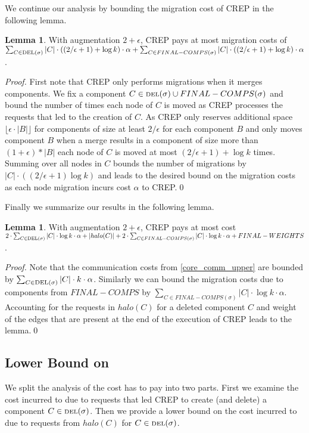 \documentclass[xcolor=dvipsnames, tikz, 12pt]{article}
\newcommand{\nl}{\newline}
\newcommand{\crep}{C{\scriptsize REP}}
\newcommand{\del}{\text{\scriptsize DEL}}
\newcommand{\opt}{\text{O{\scriptsize PT}}}
\theoremstyle{definition}
\newtheorem{lemma}[defi]{Lemma}
\begin{document}
We continue our analysis by bounding the migration cost of \crep{} in the following lemma.
\begin{lemma}
	With augmentation $2+\epsilon$, \crep{} pays at most migration costs of $\sum_{C\in\del{}(\sigma)}|C|\cdot((2/\epsilon+1)+\log k)\cdot\alpha+\sum_{C\in FINAL-COMPS(\sigma)}|C|\cdot((2/\epsilon+1)+\log k)\cdot\alpha$.
\end{lemma}

\textit{Proof.} First note that \crep{} only performs migrations when it merges components.
We fix a component $C\in\del{}(\sigma)\cup FINAL-COMPS(\sigma)$ and bound the number of times each node of $C$ is moved as \crep{} processes the requests that led to the creation of $C$. As \crep{} only reserves additional space $\lfloor\epsilon\cdot|B|\rfloor$ for components of size at least $2/\epsilon$ for each component $B$ and only moves component $B$ when a merge results in a component of size more than $(1+\epsilon)*|B|$ each node of $C$ is moved at most
$(2/\epsilon+1)+\log k$ times. Summing over all nodes in $C$ bounds the number of migrations by $|C|\cdot((2/\epsilon+1) \log k)$ and leads to the desired bound on the migration costs as each node migration incurs cost $\alpha$ to \crep{}.\qed\nl

Finally we summarize our results in the following lemma.
\begin{lemma}
	\label{crep_upper_bound}
	With augmentation $2+\epsilon$, \crep{} pays at most cost $2\cdot\sum_{C\in\del{}(\sigma)}|C|\cdot\log k\cdot\alpha+|halo(C)|+2\cdot\sum_{C\in FINAL-COMPS(\sigma)}|C|\cdot\log k\cdot\alpha+FINAL-WEIGHTS$.
\end{lemma}
\textit{Proof.} Note that the communication costs from \cref{core_comm_upper} are bounded by $\sum_{C\in\del{}(\sigma)}|C|\cdot k\cdot\alpha$. Similarly we can bound the migration costs due to components from $FINAL-COMPS$ by $\sum_{C\in FINAL-COMPS(\sigma)}|C|\cdot\log k\cdot\alpha$. Accounting for the requests in $halo(C)$ for a deleted component $C$ and weight of the edges that are present at the end of the execution of \crep{} leads to the lemma.\qed


\subsection{Lower Bound on \opt{}}
We split the analysis of the cost \opt{} has to pay into two parts. First we examine the cost incurred to \opt{} due to requests that led \crep{} to create (and delete) a component $C\in\del{}(\sigma)$. Then we provide a lower bound on the cost incurred to \opt{} due to requests from $halo(C)$ for $C\in\del{}(\sigma)$.
\end{document}
